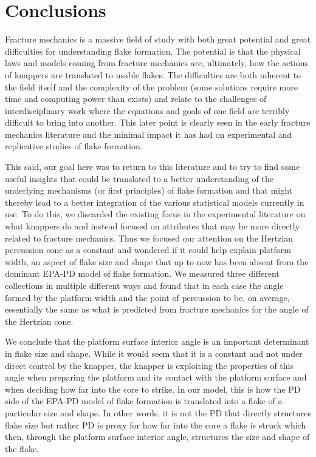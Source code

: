 \documentclass[10pt,letterpaper]{article}
\begin{document}
\hypertarget{conclusions}{%
\section{Conclusions}\label{conclusions}}

Fracture mechanics is a massive field of study with both great potential
and great difficulties for understanding flake formation. The potential
is that the physical laws and models coming from fracture mechanics are,
ultimately, how the actions of knappers are translated to usable flakes.
The difficulties are both inherent to the field itself and the
complexity of the problem (some solutions require more time and
computing power than exists) and relate to the challenges of
interdisciplinary work where the equations and goals of one field are
terribly difficult to bring into another. This later point is clearly
seen in the early fracture mechanics literature and the minimal impact
it has had on experimental and replicative studies of flake formation.

This said, our goal here was to return to this literature and to try to
find some useful insights that could be translated to a better
understanding of the underlying mechanisms (or first principles) of
flake formation and that might thereby lead to a better integration of
the various statistical models currently in use. To do this, we
discarded the existing focus in the experimental literature on what
knappers do and instead focused on attributes that may be more directly
related to fracture mechanics. Thus we focused our attention on the
Hertzian percussion cone as a constant and wondered if it could help
explain platform width, an aspect of flake size and shape that up to now
has been absent from the dominant EPA-PD model of flake formation. We
measured three different collections in multiple different ways and
found that in each case the angle formed by the platform width and the
point of percussion to be, on average, essentially the same as what is
predicted from fracture mechanics for the angle of the Hertzian cone.

We conclude that the platform surface interior angle is an important
determinant in flake size and shape. While it would seem that it is a
constant and not under direct control by the knapper, the knapper is
exploiting the properties of this angle when preparing the platform and
its contact with the platform surface and when deciding how far into the
core to strike. In our model, this is how the PD side of the EPA-PD
model of flake formation is translated into a flake of a particular size
and shape. In other words, it is not the PD that directly structures
flake size but rather PD is proxy for how far into the core a flake is
struck which then, through the platform surface interior angle,
structures the size and shape of the flake.
\end{document}
